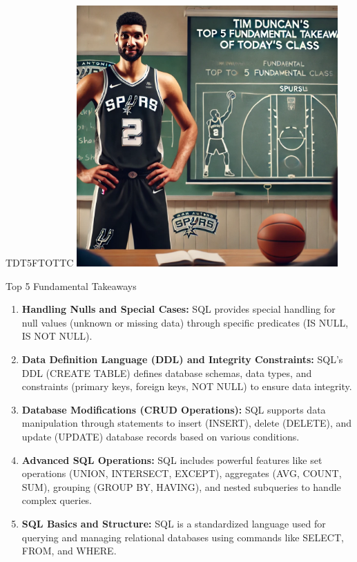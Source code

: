 \documentclass{beamer}
\begin{document}
\begin{frame}{TDT5FTOTTC}
    \centering
    \includegraphics[width=0.75\textwidth]{figures/tim.png}
\end{frame}

\begin{frame}{Top 5 Fundamental Takeaways}
    \small
    \begin{enumerate} \pause
        \item[5] \textbf{Handling Nulls and Special Cases:} SQL provides special handling for null values (unknown or missing data) through specific predicates (IS NULL, IS NOT NULL). \pause
        \item[4] \textbf{Data Definition Language (DDL) and Integrity Constraints:} SQL's DDL (CREATE TABLE) defines database schemas, data types, and constraints (primary keys, foreign keys, NOT NULL) to ensure data integrity. \pause
        \item[3] \textbf{Database Modifications (CRUD Operations):} SQL supports data manipulation through statements to insert (INSERT), delete (DELETE), and update (UPDATE) database records based on various conditions. \pause
        \item[2] \textbf{Advanced SQL Operations:} SQL includes powerful features like set operations (UNION, INTERSECT, EXCEPT), aggregates (AVG, COUNT, SUM), grouping (GROUP BY, HAVING), and nested subqueries to handle complex queries. \pause
        \item[1] \textbf{SQL Basics and Structure:} SQL is a standardized language used for querying and managing relational databases using commands like SELECT, FROM, and WHERE.
    \end{enumerate}
\end{frame}
\end{document}
